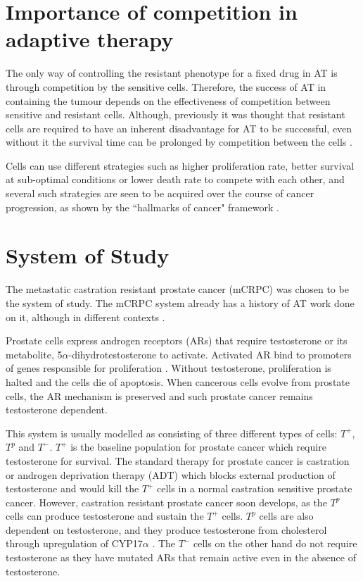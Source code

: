 \section{Importance of competition in adaptive therapy}
The only way of controlling the resistant phenotype for a fixed drug in AT is through competition by the sensitive cells. Therefore, the success of AT in containing the tumour depends on the effectiveness of competition between sensitive and resistant cells. Although, previously it was thought that resistant cells are required to have an inherent disadvantage for AT to be successful, even without it the survival time can be prolonged by competition between the cells \cite{Strobl}.

Cells can use different strategies such as higher proliferation rate, better survival at sub-optimal conditions or lower death rate to compete with each other, and several such strategies are seen to be acquired over the course of cancer progression, as shown by the ``hallmarks of cancer" framework \cite{Hanahan}.

\section{System of Study}
The metastatic castration resistant prostate cancer (mCRPC) was chosen to be the system of study. The mCRPC system already has a history of AT work done on it, although in different contexts \cite{Cunningham,Zhang}.

Prostate cells express androgen receptors (ARs) that require testosterone or its metabolite, 5$\alpha$-dihydrotestosterone to activate. Activated AR bind to promoters of genes responsible for proliferation \cite{Heinlein}. Without testosterone, proliferation is halted and the cells die of apoptosis. When cancerous cells evolve from prostate cells, the AR mechanism is preserved and such prostate cancer remains testosterone dependent.

This system is usually modelled as consisting of three different types of cells: $T^+$, $T^p$ and $T^-$. $T^+$ is the baseline population for prostate cancer which require testosterone for survival. The standard therapy for prostate cancer is castration or androgen deprivation therapy (ADT) which blocks external production of testosterone and would kill the $T^+$ cells in a normal castration sensitive prostate cancer. However, castration resistant prostate cancer soon develops, as the $T^p$ cells can produce testosterone and sustain the $T^+$ cells. $T^p$ cells are also dependent on testosterone, and they produce testosterone from cholesterol through upregulation of CYP17$\alpha$ \cite{Dillard}. The $T^-$ cells on the other hand do not require testosterone as they have mutated ARs that remain active even in the absence of testosterone.

